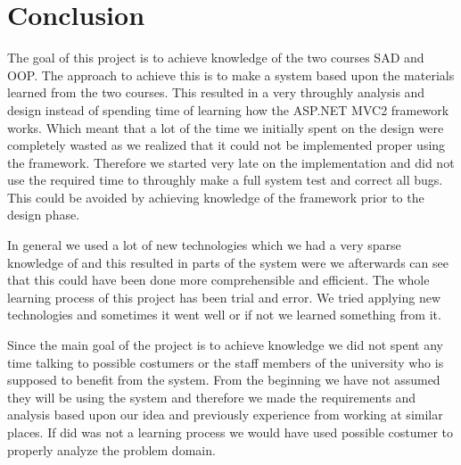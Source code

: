 \chapter{Conclusion}
\label{chap:conclusion}


The goal of this project is to achieve knowledge of the two courses SAD and OOP. The approach to achieve this is to make a system based upon the materials learned from the two courses. 
This resulted in a very throughly analysis and design instead of spending time of learning how the ASP.NET MVC2 framework works.
Which meant that a lot of the time we initially spent on the design were completely wasted as we realized that it could not be implemented proper using the framework. 
Therefore we started very late on the implementation and did not use the required time to throughly make a full system test and correct all bugs. 
This could be avoided by achieving knowledge of the framework prior to the design phase. 




In general we used a lot of new technologies which we had a very sparse knowledge of and this resulted in parts of the system were we afterwards can see that this could have been done more comprehensible and efficient. 
The whole learning process of this project has been trial and error. 
We tried applying new technologies and sometimes it went well or if not we learned something from it. 








Since the main goal of the project is to achieve knowledge we did not spent any time talking to possible costumers or the staff members of the university who is supposed to benefit from the system. From the beginning we have not assumed they will be using the system and therefore we made the requirements and analysis based upon our idea and previously experience from working at similar places. 
If did was not a learning process we would have used possible costumer to properly analyze the problem domain. 

